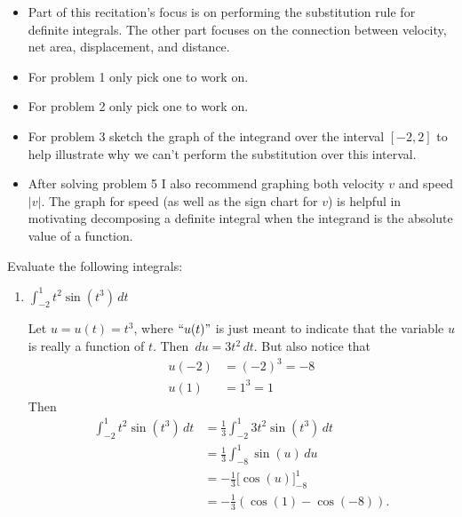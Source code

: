 \documentclass[nooutcomes, handout]{ximera}
\renewcommand{\d}{\,d}
\newcommand{\eval}[1]{\bigg[ #1 \bigg]}
\begin{document}
	
\begin{problem}
  \mbox{}
  \begin{itemize}
  \item Part of this recitation's focus is on performing the
    substitution rule for definite integrals. The other part focuses
    on the connection between velocity, net area, displacement, and
    distance.

    \item For problem 1 only pick one to work on.

    \item For problem 2 only pick one to work on.

    \item For problem 3 sketch the graph of the integrand over the
      interval $[-2,2]$ to help illustrate why we can't perform the
      substitution over this interval.

    \item After solving problem 5 I also recommend graphing both
      velocity $v$ and speed $|v|$. The graph for speed (as well as
      the sign chart for $v$) is helpful in motivating decomposing a
      definite integral when the integrand is the absolute value of a
      function.
  \end{itemize}

Evaluate the following integrals:

	\begin{enumerate}
	
	\item  $\int_{-2}^1 t^2 \sin(t^3) \d t$
		\begin{freeResponse}
		Let $u=u(t) = t^3$, where $``u(t)"$ is just meant to indicate that the variable $u$ is really a function of $t$.  Then $\d u = 3t^2 \d t$.  But also notice that
			\begin{align*}
			u(-2) &= (-2)^3 = -8  \\
			u(1) &= 1^3 = 1
			\end{align*}
		Then
			\begin{align*}
			\int_{-2}^1 t^2 \sin(t^3) \d t &= \frac{1}{3} \int_{-2}^1 3 t^2 \sin(t^3) \d t  \\
			&= \frac{1}{3} \int_{-8}^1 \sin(u) \d u  \\
			&= - \frac{1}{3} \eval{\cos(u)}_{-8}^1  \\
			&= - \frac{1}{3} ( \cos(1) - \cos(-8)).
			\end{align*}
		\end{freeResponse}
		

\end{enumerate}
\end{problem}
\end{document}
